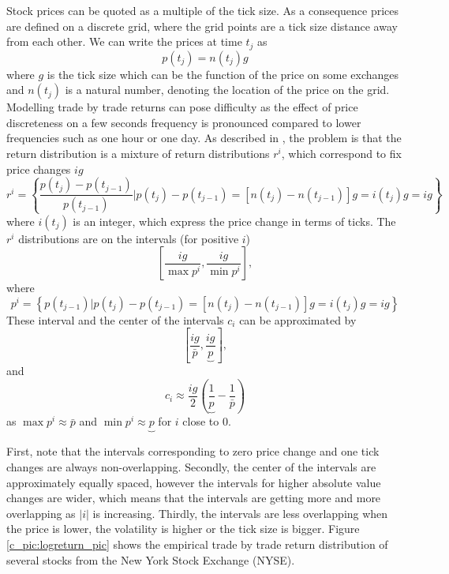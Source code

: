 \documentclass[12pt]{article}
\newcommand\munderbar[1]{\underbrace{#1}}
\begin{document}
Stock prices can be quoted as a multiple of the tick size. As a consequence prices are defined on a discrete grid, where the grid points are a tick size distance away from each other. We can write the prices at time $t_j$ as 
\begin{equation}
p(t_j) =  n(t_j)g
\end{equation}
where $g$ is the tick size which can be the function of the price on some exchanges and $n(t_j)$ is a natural number, denoting the location of the price on the grid.
Modelling trade by trade returns can pose difficulty as  the effect of price discreteness on a few seconds frequency is pronounced compared to lower frequencies such as one  hour or one day. As described in \citet{Munnix2010}, the problem is that the return distribution is a mixture of return distributions $r^i $, which correspond to fix price changes $ig$
\begin{equation}
r^{i}=\left\{\frac{p(t_j)-p(t_{j-1})}{p(t_{j-1})} \mathrel{\bigg|} p(t_j)-p(t_{j-1})=\left[n(t_j) - n(t_{j-1})\right]g = i(t_j)g=ig \right\}
\end{equation}
where $i(t_j)$ is an integer, which express the price change in terms of ticks. The $r^i$ distributions are on the intervals (for positive $i$)
\begin{equation}
\left[ \frac{ig}{\max p^{i}} , \frac{ig}{\min p^{i}} \right],
\end{equation}
where 
\begin{equation}
p^{i}=\left\{p(t_{j-1}) \mathrel{\bigg|} p(t_j)-p(t_{j-1})=\left[n(t_j) - n(t_{j-1})\right]g = i(t_j)g=ig \right\}
\end{equation}
These interval and the center of the intervals $c_i$ can be approximated by 
\begin{equation}
\left[ \frac{ig}{\bar p} , \frac{ig}{ \munderbar{p}} \right],
\end{equation}
and 
\begin{equation}
c_i \approx \frac{ig}{ 2}\left( \frac{1}{ \munderbar p} -\frac{1}{\bar p}  \right)
\end{equation}
as $ \max p^{i} \approx \bar p $  and $ \min p^{i} \approx \munderbar p $  for $i$ close to 0.

First, note that the intervals corresponding to zero price change and one tick changes are always non-overlapping. 
Secondly,  the center of the intervals are approximately equally spaced, however the intervals for higher absolute value changes are wider, which means that the intervals are getting more and more overlapping as $|i|$ is increasing. Thirdly, the intervals are less overlapping when the price is lower, the volatility is higher or the tick size is bigger. Figure \ref{c_pic:logreturn_pic} shows the empirical trade by trade return distribution of several stocks from the New York Stock Exchange (NYSE).
\end{document}
